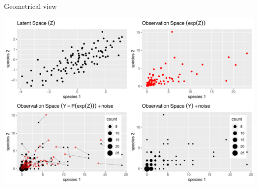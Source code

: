 \documentclass[10pt, c, xcolor=x11names]{beamer}\usepackage[]{graphicx}\usepackage[]{color}
\newenvironment{knitrout}{}{} %
\begin{document}
\begin{frame}{Geometrical view}

\begin{knitrout}\scriptsize
{}\color{fgcolor}
\includegraphics[width=.8\textwidth]{figures/PLN_geom-1} 

\end{knitrout}

\end{frame}
\end{document}
